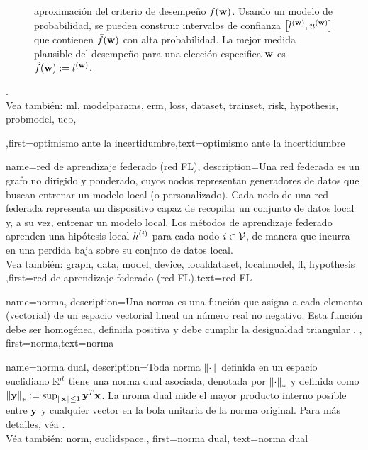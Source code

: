 {{\begin{figure}[H]
\begin{center}
{	aproximación del criterio de desempeño $\bar{f}({\bf w})$. Usando un modelo de probabilidad, se pueden construir intervalos de confianza $\big[ l^{({\bf w})},  u^{({\bf w})} \big]$ 
	que contienen $\bar{f}({\bf w})$ con alta probabilidad. La mejor medida plausible del desempeño para una elección especifica ${\bf w}$ es $\tilde{f}({\bf w}) := l^{({\bf w})}$.} 
	\end{center}
		\end{figure}.
		\\
	 Vea también: \gls{ml}, \glspl{modelparam}, \gls{erm}, \gls{loss}, \gls{dataset}, \gls{trainset}, \gls{risk}, \gls{hypothesis}, \gls{probmodel}, \gls{ucb},  },first={optimismo ante la incertidumbre},text={optimismo ante la incertidumbre} 
}

{name={red de aprendizaje federado (red FL)},
	description={Una red federada es un grafo no dirigido y ponderado, 
	cuyos nodos representan generadores de datos que buscan entrenar un modelo local (o personalizado). 
	Cada nodo de una red federada representa un dispositivo capaz de recopilar un conjunto de datos local
	y, a su vez, entrenar un modelo local. 
	Los métodos de aprendizaje federado aprenden una hipótesis local $h^{(i)}$ para
	cada nodo $i \in \mathcal{V}$, de manera que incurra en una perdida baja sobre su conjnto de datos local.
	\\
	 Vea también: \gls{graph},  \gls{data}, \gls{model}, \gls{device}, \gls{localdataset}, \gls{localmodel}, \gls{fl}, \gls{hypothesis}  },first={red de aprendizaje federado (red FL)},text={red FL} 
 }

{name={norma},
	description={Una norma es una función que asigna a cada elemento (vectorial) de un espacio 
		vectorial lineal un número real no negativo. Esta función debe ser homogénea, definida positiva y debe 
		cumplir la desigualdad triangular \cite{HornMatAnalysis}. },
	first={norma},text={norma} 
}

{name={norma dual},
description={Toda norma $\left\Vert {\cdot} \right\Vert_{}$ definida en un espacio euclidiano $\mathbb{R}^{d}$ 
		tiene una norma dual asociada, denotada por $\left\Vert {\cdot} \right\Vert_{*}$ y definida como 
		$\left\Vert {{\bf y}} \right\Vert_{*} := \sup_{\Vert {{\bf x}} \Vert{} \le 1} {\bf y}^{T} {\bf x}$. 
		La nroma dual mide el mayor producto interno posible entre ${\bf y}$ y cualquier vector 
		en la bola unitaria de la norma original. Para más detalles, véa 
		\cite[Sec.~A.1.6]{BoydConvexBook}.\\ 
		Véa también: \gls{norm}, \gls{euclidspace}.},
	first={norma dual},
	text={norma dual}
}

